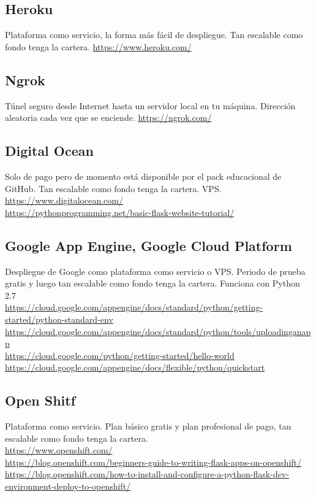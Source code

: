 \subsection{Heroku}
Plataforma como servicio, la forma más fácil de despliegue. Tan escalable como fondo tenga la cartera. \url{https://www.heroku.com/}
\subsection{Ngrok}
Túnel seguro desde Internet hasta un servidor local en tu máquina. Dirección aleatoria cada vez que se enciende. \url{https://ngrok.com/}
\subsection{Digital Ocean}
Solo de pago pero de momento está disponible por el pack educacional de GitHub. Tan escalable como fondo tenga la cartera. VPS.\\ \url{https://www.digitalocean.com/}\\ \url{https://pythonprogramming.net/basic-flask-website-tutorial/}
\subsection{Google App Engine, Google Cloud Platform}
Despliegue de Google como plataforma como servicio o VPS. Periodo de prueba gratis y luego tan escalable como fondo tenga la cartera. Funciona con Python 2.7\\
\url{https://cloud.google.com/appengine/docs/standard/python/getting-started/python-standard-env}\\
\url{https://cloud.google.com/appengine/docs/standard/python/tools/uploadinganapp}\\
\url{https://cloud.google.com/python/getting-started/hello-world}\\
\url{https://cloud.google.com/appengine/docs/flexible/python/quickstart}
\subsection{Open Shitf}
Plataforma como servicio. Plan básico gratis y plan profesional de pago, tan escalable como fondo tenga la cartera.\\
\url{https://www.openshift.com/}\\
\url{https://blog.openshift.com/beginners-guide-to-writing-flask-apps-on-openshift/}\\
\url{https://blog.openshift.com/how-to-install-and-configure-a-python-flask-dev-environment-deploy-to-openshift/}
